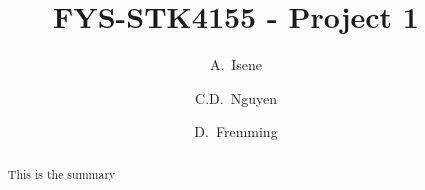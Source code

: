 
\lstset{style=mystyle}

\usepackage[colorlinks=true,allcolors=blue]{hyperref}
\usepackage{pdfpages}





\begin{frontmatter}


\title{FYS-STK4155 - Project 1}
\author[CS:PH]{A.~Isene}
\author[CS:IM]{C.D.~Nguyen}
\author[ROBOTIKK]{D.~Fremming}

\address[CS:PH]{UiO, Computational Science: Physics.}
\address[CS:IM]{UiO, Computational Science: Imaging and Biomedical Computing.}
\address[ROBOTIKK]{UiO, Robotics and Intelligent Systems.}

\begin{abstract}
    This is the summary
\end{abstract}

\end{frontmatter}

\newpage


\newpage

\hfill\break




